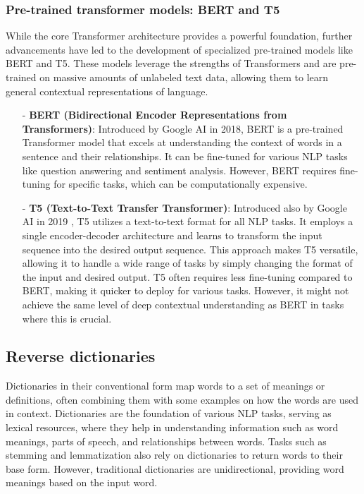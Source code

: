 \documentclass[12pt]{article}
\begin{document}
\subsubsection{Pre-trained transformer models: BERT and T5}

While the core Transformer architecture provides a powerful foundation, further advancements have led to the development of specialized pre-trained models like BERT and T5. These models leverage the strengths of Transformers and are pre-trained on massive amounts of unlabeled text data, allowing them to learn general contextual representations of language.

\begin{enumerate}
    \item[-] \textbf{BERT (Bidirectional Encoder Representations from Transformers)}: Introduced by Google AI \cite{devlin2018} in 2018, BERT is a pre-trained Transformer model that excels at understanding the context of words in a sentence and their relationships. It can be fine-tuned for various NLP tasks like question answering and sentiment analysis. However, BERT requires fine-tuning for specific tasks, which can be computationally expensive.
    \item[-] \textbf{T5 (Text-to-Text Transfer Transformer)}: Introduced also by Google AI in 2019 \cite{Raffel2019}, T5 utilizes a text-to-text format for all NLP tasks. It employs a single encoder-decoder architecture and learns to transform the input sequence into the desired output sequence. This approach makes T5 versatile, allowing it to handle a wide range of tasks by simply changing the format of the input and desired output. T5 often requires less fine-tuning compared to BERT, making it quicker to deploy for various tasks. However, it might not achieve the same level of deep contextual understanding as BERT in tasks where this is crucial.
\end{enumerate}

\subsection{Reverse dictionaries}

Dictionaries in their conventional form map words to a set of meanings or definitions, often combining them with some examples on how the words are used in context. Dictionaries are the foundation of various NLP tasks, serving as lexical resources, where they help in understanding information such as word meanings, parts of speech, and relationships between words. Tasks such as stemming and lemmatization also rely on dictionaries to return words to their base form. However, traditional dictionaries are unidirectional, providing word meanings based on the input word.
\end{document}
